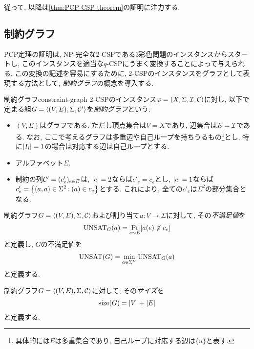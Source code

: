 従って, 以降は\cref{thm:PCP-CSP-theorem}の証明に注力する.

\subsection{制約グラフ}
PCP定理の証明は, NP-完全な2-CSPである3彩色問題のインスタンスからスタートし,
このインスタンスを適当な$q$-CSPにうまく変換することによって与えられる.
この変換の記述を容易にするために, 2-CSPのインスタンスをグラフとして表現する方法として, \emph{制約グラフ}の概念を導入する.

\begin{definition}{制約グラフ}{constraint-graph}
  2-CSPのインスタンス$\varphi=(X,\Sigma,\mathcal{I},\mathcal{C})$に対し, 以下で定まる組$G=\langle(V,E),\Sigma,\mathcal{C}'\rangle$を\emph{制約グラフ}という:
  \begin{itemize}
    \item $(V,E)$はグラフである. ただし頂点集合は$V=X$であり, 辺集合は$E=\mathcal{I}$である. なお, ここで考えるグラフは多重辺や自己ループを持ちうるもの\footnote{具体的には$E$は多重集合であり, 自己ループに対応する辺は$\{u\}$と表す.}とし, 特に$\abs{I_i}=1$の場合は対応する辺は自己ループとする.
    \item アルファベット$\Sigma$.
    \item 制約の列$\mathcal{C}'=(c'_e)_{e\in E}$は, $\abs{e}=2$ならば$c'_e=c_e$とし, $\abs{e}=1$ならば$c'_e=\qty{ (a,a) \in \Sigma^2 \colon (a)\in c_e }$とする. これにより, 全ての$c'_e$は$\Sigma^2$の部分集合となる.
  \end{itemize}

  制約グラフ$G=\langle(V,E),\Sigma,\mathcal{C}\rangle$および割り当て$a\colon V\to \Sigma$に対して, その\emph{不満足値}を
  \begin{align*}
    \mathrm{UNSAT}_G(a) = \Pr_{e\sim E}[a(e) \not\in c_e]
  \end{align*}
  と定義し, $G$の不満足値を
  \begin{align*}
    \mathrm{UNSAT}(G) = \min_{a\in\Sigma^V} \mathrm{UNSAT}_G(a)
  \end{align*}
  と定義する.

  制約グラフ$G=\langle(V,E),\Sigma,\mathcal{C}\rangle$に対して, その\emph{サイズ}を
  \begin{align*}
    \mathrm{size}(G) = \abs{V} + \abs{E}
  \end{align*}
  と定義する.
\end{definition}


